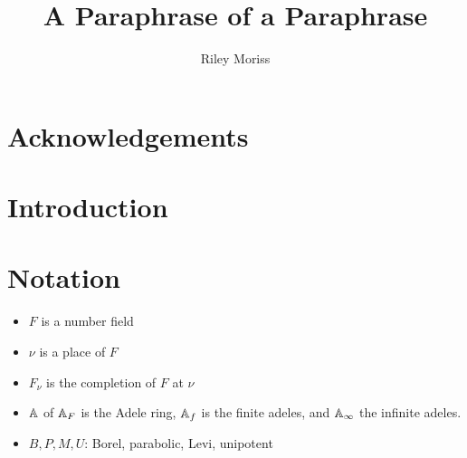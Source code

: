 \documentclass[10pt, openany]{book}
\title{A Paraphrase of a Paraphrase}
\author{Riley Moriss}
\numberwithin{equation}{section}
\theoremstyle{definition}
\theoremstyle{remark}
\numberwithin{equation}{section}
\begin{document}
\begin{comment}%
    \begin{titlepage}
    \begin{center}
    \vspace*{1cm}
    \huge
    \textbf{A Paraphrase of a Paraphrase}\\
    \vspace{2cm}
    \Large
    \text{Riley Moriss}\\
    \vspace{0.5cm}
    \text{Supervisor: Dr. Chenyan Wu }\\    
 
    A thesis submitted in partial fulfillment of the\\
    requirements for the degree of\\
    Master of Science\\
    in the\\
    School of Mathematics and Statistics\\
    at\\
    The University of Melbourne\\
    \vspace{1,5cm}
    October 2024
\end{center}
\end{titlepage}

\pagebreak
\end{comment}

\chapter*{Acknowledgements}

\chapter*{Introduction}


\tableofcontents
{}

\chapter*{Notation}

\begin{itemize}
    \item \(F\) is a number field
    \item \(\nu\) is a place of \(F\)
    \item \(F_\nu\) is the completion of \(F\) at \(\nu\)
    \item \(\A\) of \(\A_F\) is the Adele ring, \(\A_f\) is the finite adeles, and \(\A_\infty\) the infinite adeles.
    \item \(B, P, M, U\): Borel, parabolic, Levi, unipotent
\end{itemize}
\end{document}
